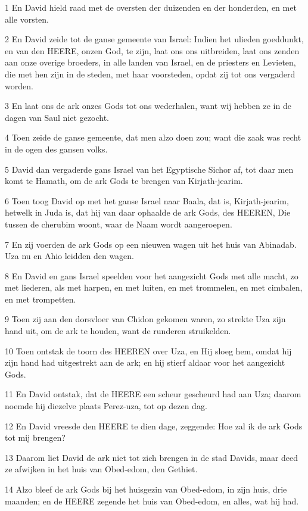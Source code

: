 \par 1 En David hield raad met de oversten der duizenden en der honderden, en met alle vorsten.
\par 2 En David zeide tot de ganse gemeente van Israel: Indien het ulieden goeddunkt, en van den HEERE, onzen God, te zijn, laat ons ons uitbreiden, laat ons zenden aan onze overige broeders, in alle landen van Israel, en de priesters en Levieten, die met hen zijn in de steden, met haar voorsteden, opdat zij tot ons vergaderd worden.
\par 3 En laat ons de ark onzes Gods tot ons wederhalen, want wij hebben ze in de dagen van Saul niet gezocht.
\par 4 Toen zeide de ganse gemeente, dat men alzo doen zou; want die zaak was recht in de ogen des gansen volks.
\par 5 David dan vergaderde gans Israel van het Egyptische Sichor af, tot daar men komt te Hamath, om de ark Gods te brengen van Kirjath-jearim.
\par 6 Toen toog David op met het ganse Israel naar Baala, dat is, Kirjath-jearim, hetwelk in Juda is, dat hij van daar ophaalde de ark Gods, des HEEREN, Die tussen de cherubim woont, waar de Naam wordt aangeroepen.
\par 7 En zij voerden de ark Gods op een nieuwen wagen uit het huis van Abinadab. Uza nu en Ahio leidden den wagen.
\par 8 En David en gans Israel speelden voor het aangezicht Gods met alle macht, zo met liederen, als met harpen, en met luiten, en met trommelen, en met cimbalen, en met trompetten.
\par 9 Toen zij aan den dorsvloer van Chidon gekomen waren, zo strekte Uza zijn hand uit, om de ark te houden, want de runderen struikelden.
\par 10 Toen ontstak de toorn des HEEREN over Uza, en Hij sloeg hem, omdat hij zijn hand had uitgestrekt aan de ark; en hij stierf aldaar voor het aangezicht Gods.
\par 11 En David ontstak, dat de HEERE een scheur gescheurd had aan Uza; daarom noemde hij diezelve plaats Perez-uza, tot op dezen dag.
\par 12 En David vreesde den HEERE te dien dage, zeggende: Hoe zal ik de ark Gods tot mij brengen?
\par 13 Daarom liet David de ark niet tot zich brengen in de stad Davids, maar deed ze afwijken in het huis van Obed-edom, den Gethiet.
\par 14 Alzo bleef de ark Gods bij het huisgezin van Obed-edom, in zijn huis, drie maanden; en de HEERE zegende het huis van Obed-edom, en alles, wat hij had.

